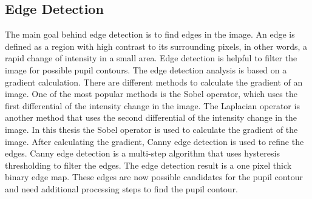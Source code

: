 \subsection{Edge Detection}
The main goal behind edge detection is to find edges in the image. An edge is defined as a region with high contrast to its surrounding pixels, in other words, a rapid change of intensity in a small area. Edge detection is helpful to filter the image for possible pupil contours. The edge detection analysis is based on a gradient calculation. There are different methods to calculate the gradient of an image. One of the most popular methods is the Sobel operator, which uses the first differential of the intensity change in the image. The Laplacian operator is another method that uses the second differential of the intensity change in the image. In this thesis the Sobel operator is used to calculate the gradient of the image. 
After calculating the gradient, Canny edge detection is used to refine the edges. Canny edge detection is a multi-step algorithm that uses hysteresis thresholding to filter the edges. The edge detection result is a one pixel thick binary edge map.  These edges are now possible candidates for the pupil contour and need additional processing steps to find the pupil contour. 
